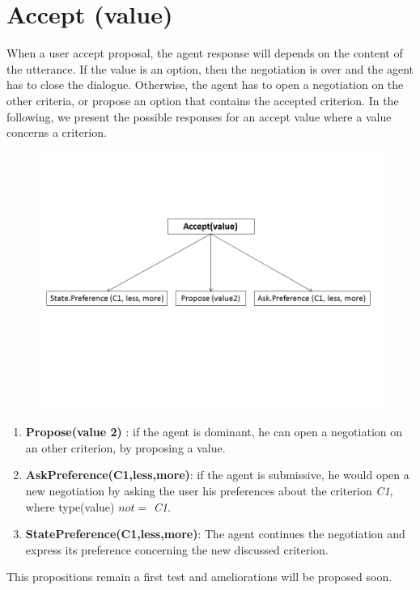 \documentclass{llncs}
\begin{document}
\section{Accept (value)}
\par When a user accept proposal, the agent response will depends on the content of the utterance. If the value is an option, then the negotiation is over and the agent has to close the dialogue. Otherwise, the agent has to open a negotiation on the other criteria, or propose an option that contains the accepted criterion.  In the following, we present the possible responses for an accept value where a value concerns a criterion. 
\begin{figure}[h]
	\centerline{\includegraphics[width=5in]{utterances/Diapositive5.PNG}}
	\vskip 8pt
\end{figure}
\begin{enumerate}
	
	\item \textbf{Propose(value 2)} : if the agent is  dominant, he can open a negotiation on an other criterion, by proposing a value. 
	 
	\item \textbf{AskPreference(C1,less,more)}: if the agent is submissive, he would open a new negotiation by asking the user his preferences about the criterion \emph{C1}, where type(value) $not=$  \emph{C1}.
	
	
	\item \textbf{StatePreference(C1,less,more)}: The agent continues the negotiation and express its preference concerning the new discussed criterion.
	
\end{enumerate}	

	\par This propositions remain a first test and ameliorations will be proposed soon.
\end{document}
